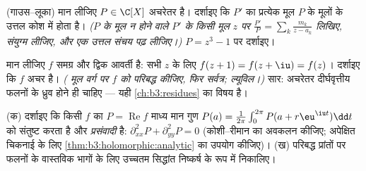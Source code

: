 \begin{exercise}[$\star\star\star$]\label{exo:b3:holomorphic:8}
(गाउस--लूका) मान लीजिए $P \in \C[X]$ अचरेतर है। दर्शाइए कि $P'$ का
प्रत्येक मूल $P$ के मूलों के उत्तल कोश में होता है।
\emph{($P$ के मूल न होने वाले $P'$ के किसी मूल $z$ पर $\frac{P'}{P} = \sum_k\frac{m_k}{z - a_k}$
लिखिए, संयुग्म लीजिए, और एक उत्तल संचय पढ़ लीजिए।)} $P = z^3 - 1$ पर
दर्शाइए।
\end{exercise}

\begin{exercise}[$\star\star\star$]\label{exo:b3:holomorphic:9}
मान लीजिए $f$ समग्र और द्विक आवर्ती है: सभी $z$ के लिए $f(z + 1) = f(z + \iu)
= f(z)$।
दर्शाइए कि $f$ अचर है। \emph{( मूल वर्ग पर $f$ को परिबद्ध
कीजिए, फिर सर्वत्र; ल्यूविल।)} सार: अचरेतर दीर्घवृत्तीय फलनों के
ध्रुव होने ही चाहिए --- यही \cref{ch:b3:residues} का विषय है।
\end{exercise}

\begin{exercise}[$\star\star$]\label{exo:b3:holomorphic:10}
(क) दर्शाइए कि किसी  $f$ का $P = \operatorname{Re}f$ माध्य मान गुण
$P(a) =
\frac1{2\pi}\int_0^{2\pi}P(a + r\eu^{\iu t})\dd t$ को संतुष्ट करता है और \emph{प्रसंवादी} है: $\partial^2_{xx}P + \partial^2_{yy}P = 0$
(कोशी--रीमान का अवकलन कीजिए; अपेक्षित चिकनाई के लिए \cref{thm:b3:holomorphic:analytic} का
उपयोग कीजिए)।
(ख) परिबद्ध प्रांतों पर  फलनों के वास्तविक भागों के
लिए उच्चतम सिद्धांत निष्कर्ष के रूप में निकालिए।
\end{exercise}

